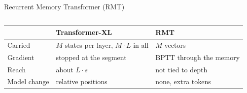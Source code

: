 \begin{frame}{Recurrent Memory Transformer (RMT)}
\begin{columns}[T,onlytextwidth]
{\begin{tabular}{@{}>{\raggedright\arraybackslash}p{1.25cm} >{\raggedright\arraybackslash}p{2.2cm} >{\raggedright\arraybackslash}p{2.0cm}@{}}
        \toprule
         & \textbf{Transformer-XL} & \textbf{RMT} \\
        \midrule
        Carried & $M$ states per layer, $M\cdot L$ in all & $M$ vectors \\
        \addlinespace[0.15em]
        Gradient & stopped at the segment & BPTT through the memory \\
        \addlinespace[0.15em]
        Reach & about $L\cdot s$ & not tied to depth \\
        \addlinespace[0.15em]
        Model change & relative positions & none, extra tokens \\
        \bottomrule
      \end{tabular}\par}
  \end{columns}
\end{frame}

